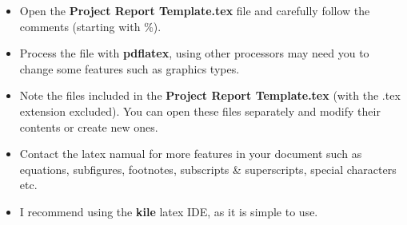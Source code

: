\documentclass[a4paper,12pt]{report}
\begin{document}
{%
\begin{itemize}
\item Open the {\bf Project Report Template.tex} file and carefully follow the comments (starting with \%).
\item Process the file with {\bf pdflatex}, using other processors may need you to change some features such as graphics types.
\item Note the files included in the  {\bf Project Report Template.tex} (with the .tex extension excluded). You can open these files separately and modify their contents 
or create new ones.
\item Contact the latex namual for more features in your document such as equations, subfigures, footnotes, subscripts \& superscripts, special characters etc.
\item I recommend using the {\bf kile} latex IDE, as it is simple to use.
\end{itemize}


\newpage
\tableofcontents



\newpage
\fancyhead[RE,LO]{}
\fancyhead[LE]{\leftmark}
\fancyhead[RO]{\rightmark}
\pagestyle{fancy}










\appendix


}
\end{document}
